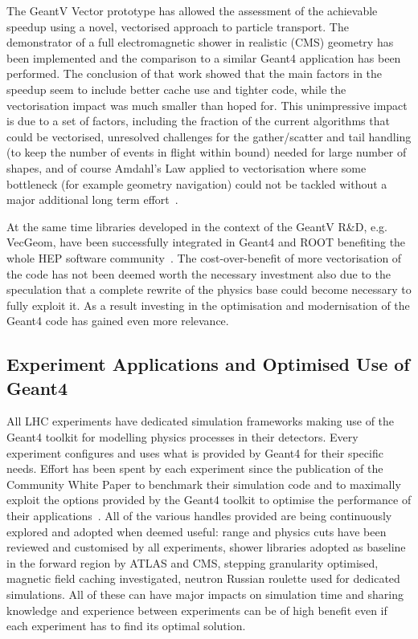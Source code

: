 The GeantV Vector prototype has allowed the assessment
of the achievable speedup using a novel, vectorised approach to particle
transport. The demonstrator of a full electromagnetic shower in
realistic (CMS) geometry has been implemented and the comparison to a
similar Geant4 application has been performed. The conclusion of that
work showed that the main factors in the speedup seem to include better
cache use and tighter code, while the vectorisation impact was much
smaller than hoped for. This unimpressive impact is due to a set of
factors, including the fraction of the current algorithms that could be
vectorised, unresolved challenges for the gather/scatter and tail
handling (to keep the number of events in flight within bound) needed
for large number of shapes, and of course Amdahl's Law applied to
vectorisation where some bottleneck (for example geometry navigation)
could not be tackled without a major additional long term effort~\cite{GeantV}.

At the same time libraries developed in the context of the
GeantV R\&D, e.g. VecGeom, have been successfully integrated in Geant4
and ROOT benefiting the whole HEP software community~\cite{CMS01}. The
cost-over-benefit of more vectorisation of the code has not been deemed
worth the necessary investment also due to the speculation that a
complete rewrite of the physics base could become necessary to fully
exploit it. As a result investing in the optimisation and modernisation
of the Geant4 code has gained even more relevance.

\hypertarget{experiments-applications-and-optimisation-of-the-use-of-geant4}{%
\subsection{Experiment Applications and Optimised Use of
Geant4}\label{experiments-applications-and-optimisation-of-the-use-of-geant4}}

All LHC experiments have dedicated simulation frameworks making use of
the Geant4 toolkit for modelling physics processes in their detectors. Every experiment
configures and uses what is provided by Geant4 for their specific needs.
Effort has been spent by each experiment since the publication of the
Community White Paper to benchmark their 
simulation code and to maximally
exploit the options provided by the Geant4 toolkit to optimise the
performance of their applications~\cite{ATLAS-G4OPT}. All of the various handles provided
are being continuously explored and adopted when deemed useful: range
and physics cuts have been reviewed and customised by all experiments,
shower libraries adopted as baseline in the forward region by ATLAS and
CMS, stepping granularity optimised, magnetic field caching
investigated, neutron Russian roulette used for dedicated simulations.
All of these can have major impacts on simulation time and sharing
knowledge and experience between experiments can be of high benefit even
if each experiment has to find its optimal solution.

